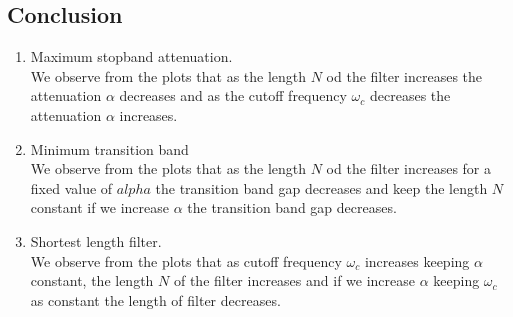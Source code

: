 \documentclass[conference]{IEEEtran}
\begin{document}
\subsection{Conclusion}
\begin{enumerate}[label=(\alph*)]
\item Maximum stopband attenuation.\\
We observe from the plots that as the length $N$ od the filter increases the attenuation $\alpha$ decreases and as the cutoff frequency $\omega_c$ decreases the attenuation $\alpha$ increases.

\item Minimum transition band\\
We observe from the plots that as the length $N$ od the filter increases for a fixed value of $alpha$ the transition band gap decreases and keep the length $N$ constant if we increase $\alpha$ the transition band gap decreases.

\item Shortest length filter.\\
We observe from the plots that as cutoff frequency $\omega_c$ increases keeping $\alpha$ constant, the length $N$ of the filter increases and if we increase $\alpha$ keeping $\omega_c$ as constant the length of filter decreases.  
\end{enumerate}
\end{document}
